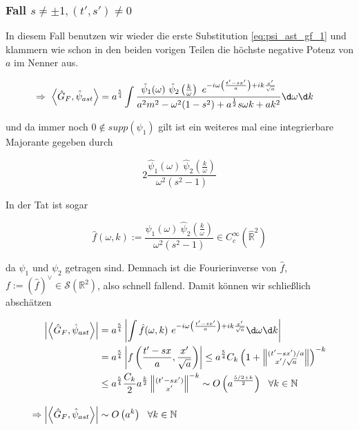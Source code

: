 \subsubsection*{Fall $s \neq \pm 1, (t', s') \neq 0$}
In diesem Fall benutzen wir wieder die erste Substitution \eqref{eq:psi_ast_gf_1}
und klammern wie schon in den beiden vorigen Teilen die höchste negative
Potenz von $a$ im Nenner aus.

\begin{align}
\Rightarrow ~
    \left< \hat G_F,\hat\psi_{ast} \right>
    &=
    a^{\frac{5}{4}} \int \frac{
        \hat \psi_1 (\omega) ~\hat \psi_2 \left(\frac{k}{\omega}\right)
        ~ e^{-i \omega \left(\frac{t'-sx'}{a}\right) + i k \frac{x'}{\sqrt{a}}}
    }
    {
        a^2 m^2 - \omega^2 (1-s^2) + a^{\frac{1}{2}} s \omega k +a k^2
    }
    \d \omega \d k
\end{align}

und da immer noch $0 \notin supp(\psi_1)$ gilt ist ein weiteres mal eine integrierbare Majorante gegeben durch

\begin{equation}
    2\frac{\hat \psi_1 (\omega)~\hat\psi_2 \left(\frac{k}{\omega}\right)}
    {\omega^2(s^2-1)}
\end{equation}

In der Tat ist sogar

\begin{equation}
    \hat f(\omega, k) := \frac{\hat \psi_1 (\omega)~\hat\psi_2 \left(\frac{k}{\omega}\right)}
    {\omega^2(s^2-1)}
    \in C_c^\infty (\hat{\mathbb{R}}^2)
\end{equation}

da $\psi_1$ und $\psi_2$ getragen sind. Demnach ist die Fourierinverse von
$\hat f$, $f := (\hat f)^\vee \in \mathcal{S}(\mathbb{R}^2)$, also schnell
fallend. Damit können wir schließlich abschätzen

\begin{align}
    \left| \left<  \hat G_F,\hat\psi_{ast} \right> \right|
    &=
    a^{\frac{5}{4}} \left|  \int \hat f(\omega, k)
    ~e^{-i \omega \left(\frac{t'-sx'}{a}\right) + ik \frac{x'}{\sqrt{a}}}
    \d \omega \d k
    \right|
    \nonumber \\
    &=
    a^{\frac{5}{4}} \left| f \left(\frac{t'-sx}{a}, \frac{x'}{\sqrt{a}}\right) \right|
    \leq
    a^{\frac{5}{4}} C_k\left(
    1 + \left\lVert \substack{(t'-sx')/a \\ x'/\sqrt{a}} \right\rVert
    \right)^{-k}
    \nonumber \\
    &\leq
    a^{\frac{5}{4}} \frac{C_k}{2} a^{\frac{k}{2}} \left\lVert
    \substack{(t'-sx') \\ x'} \right\rVert^{-k}
    \sim O\left(a^{\frac{5/2+k}{2}}\right) ~~ \forall k \in \mathbb{N}
    \nonumber \\[1em]
    \Rightarrow
     \left| \left< \hat G_F, \hat\psi_{ast} \right> \right|
     &\sim
     O\left(a^k\right) ~~ \forall k \in \mathbb{N}
     \label{eq:gf_s_neq=1_xt_neq_0}
\end{align}


